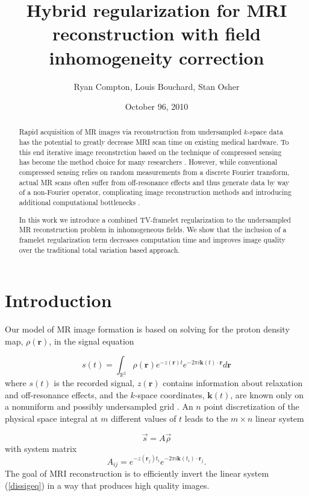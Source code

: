 \documentclass[12pt]{amsart}
\title{Hybrid regularization for MRI reconstruction with field inhomogeneity correction}
\author{Ryan Compton, Louis Bouchard, Stan Osher}
\date{October 96, 2010}
\theoremstyle{remark}
\begin{document}
\begin{abstract}
Rapid acquisition of MR images via reconstruction from undersampled $k$-space data has the potential to greatly decrease MRI scan time on existing medical hardware. To this end iterative image reconstrction based on the technique of compressed sensing has become the method choice for many researchers \cite{Lustig2007}. However, while conventional compressed sensing relies on random measurements from a discrete Fourier transform, actual MR scans often suffer from off-resonance effects and thus generate data by way of a non-Fourier operator, complicating image reconstruction methods and introducing additional computational bottlenecks \cite{Fessler2005}.

In this work we introduce a combined TV-framelet regularization to the undersampled MR reconstruction problem in inhomogeneous fields. We show that the inclusion of a framelet regularization term decreases computation time and improves image quality over the traditional total variation based approach.

\end{abstract}

\maketitle


\section{Introduction}
Our model of MR image formation is based on solving for the proton density map, $\rho(\mathbf{r})$, in the signal equation

\begin{equation}\label{sigeq}
s(t) = \int_{\mathbb{R}^2} \rho(\mathbf{r})e^{-z(\mathbf{r})t}e^{-2\pi i \mathbf{k}(t) \cdot \mathbf{r}} d\mathbf{r}
\end{equation}
where $s(t)$ is the recorded signal, $z(\mathbf{r})$ contains information about relaxation and off-resonance effects, and the $k$-space coordinates, $\mathbf{k}(t)$, are known only on a nonuniform and possibly undersampled grid \cite{Haacke1999}. An $n$ point discretization of the physical space integral at $m$ different values of $t$ leads to the $m \times n$ linear system

\begin{equation}\label{dissigeq}
\vec{s} = A \vec{\rho}
\end{equation}
with system matrix
\begin{equation}\label{aij}
A_{ij} = e^{-z(\mathbf{r}_j)t_i}e^{-2\pi i \mathbf{k}(t_i) \cdot \mathbf{r}_j}.
\end{equation}
The goal of MRI reconstruction is to efficiently invert the linear system (\ref{dissigeq}) in a way that produces high quality images.
\end{document}
